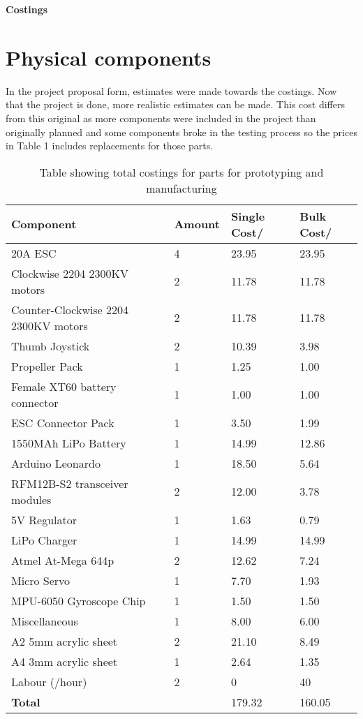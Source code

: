 \documentclass[a4paper,11pt]{article}
\begin{document}
  
\begin{center}
{\Large{\textbf{Costings}}} \\ [\baselineskip]
\end{center}

\section{Physical components}
In the project proposal form, estimates were made towards the costings. Now that the project is done, more realistic estimates can be made. This cost differs from this original as more components were included in the project than originally planned and some components broke in the testing process so the prices in Table 1 includes replacements for those parts.
\begin{table}[htp]
\begin{tabular}{|l|l|l|l|}
	\hline
	Component & Amount & Single Cost/\textsterling & Bulk Cost/\textsterling  \\
	\hline
	20A ESC & 4 & 23.95 & 23.95\\
	\hline
	Clockwise 2204 2300KV motors & 2 & 11.78 & 11.78\\
	\hline
    Counter-Clockwise 2204 2300KV motors & 2 & 11.78 & 11.78\\
	\hline
    Thumb Joystick & 2 & 10.39 & 3.98\\
	\hline
	Propeller Pack & 1 & 1.25 & 1.00\\
	\hline
	Female XT60 battery connector & 1 & 1.00 & 1.00\\
	\hline
	ESC Connector Pack & 1 & 3.50 & 1.99\\
	\hline
	1550MAh LiPo Battery & 1 & 14.99 & 12.86\\
	\hline    
	Arduino Leonardo & 1 & 18.50 & 5.64\\
	\hline
	RFM12B-S2 transceiver modules & 2 & 12.00 & 3.78\\
	\hline
	5V Regulator & 1 & 1.63 & 0.79\\
	\hline
	LiPo Charger & 1 & 14.99 & 14.99\\
	\hline
	Atmel At-Mega 644p & 2 & 12.62 & 7.24 \\ 
	\hline
	Micro Servo & 1 & 7.70 & 1.93\\ 
	\hline
	MPU-6050 Gyroscope Chip & 1 & 1.50 & 1.50 \\ 
	\hline
	Miscellaneous  & 1 & 8.00 & 6.00\\ 
	\hline
	A2 5mm acrylic sheet  & 2 & 21.10 & 8.49 \\ 
	\hline
	A4 3mm acrylic sheet  & 1 & 2.64 & 1.35\\ 
	\hline
    Labour (\textsterling20/hour)  & 2 & 0 & 40\\ 
	\hline
	\textbf{Total}& &179.32&160.05\\
	\hline
\end{tabular}
\caption{Table showing total costings for parts for prototyping and manufacturing}
\end{table}
\end{document}
